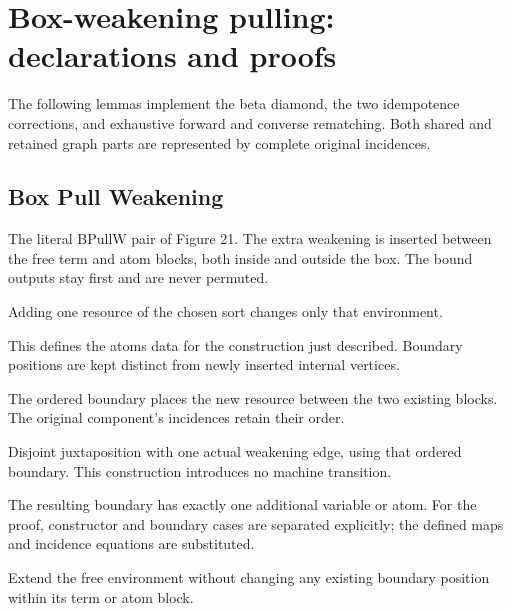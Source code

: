 \clearpage
\section{Box-weakening pulling: declarations and proofs}
\label{sec:bpullw-concordance}
The following lemmas implement the beta diamond, the two idempotence corrections, and exhaustive forward and converse rematching. Both shared and retained graph parts are represented by complete original incidences.

\subsection{Box Pull Weakening}
The literal BPullW pair of Figure 21. The extra weakening is inserted between the free term and atom blocks, both inside and outside the box. The bound outputs stay first and are never permuted.

Adding one resource of the chosen sort changes only that environment.
\par{}

This defines the atoms data for the construction just described. Boundary positions are kept distinct from newly inserted internal vertices.
\par{}

The ordered boundary places the new resource between the two existing blocks. The original component's incidences retain their order.
\par{}

Disjoint juxtaposition with one actual weakening edge, using that ordered boundary. This construction introduces no machine transition.
\par{}

The resulting boundary has exactly one additional variable or atom.
For the proof, constructor and boundary cases are separated explicitly; the defined maps and incidence equations are substituted.
\par{}

Extend the free environment without changing any existing boundary position within its term or atom block.
\par{}

